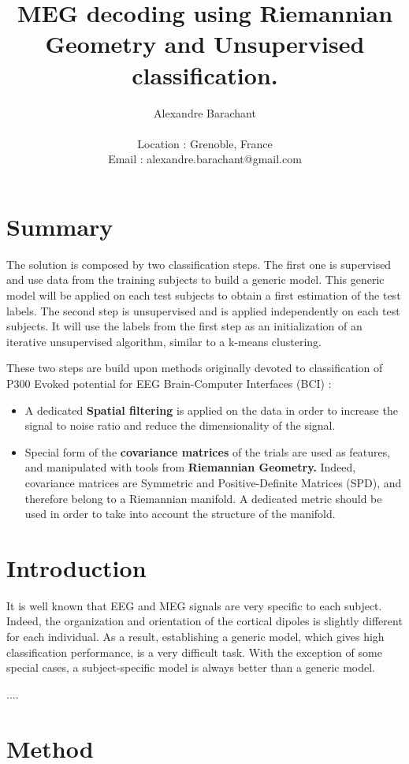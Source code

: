 \documentclass[11pt,a4paper]{article}
\title{\textbf{MEG decoding using Riemannian Geometry and Unsupervised classification.}}
\author{Alexandre Barachant \\ \\ Location : Grenoble, France \\ Email : alexandre.barachant@gmail.com }
\date{}
\begin{document}
\maketitle

\section{Summary}
The solution is composed by two classification steps. The first one is supervised and use data from the training subjects to build a generic model. This generic model will be applied on each test subjects to obtain a first estimation of the test labels. The second step is unsupervised and is applied independently on each test subjects. It will use the labels from the first step as an initialization of an iterative unsupervised algorithm, similar to a k-means clustering. 

These two steps are build upon methods originally devoted to classification of P300 Evoked potential for EEG Brain-Computer Interfaces (BCI) :
\begin{itemize}
\item A dedicated \textbf{Spatial filtering} is applied on the data in order to increase the signal to noise ratio and reduce the dimensionality of the signal.
\item Special form of the \textbf{covariance matrices} of the trials are used as features, and manipulated with tools from \textbf{Riemannian Geometry.} Indeed, covariance matrices are Symmetric and Positive-Definite Matrices (SPD), and therefore belong to a Riemannian manifold. A dedicated metric should be used in order to take into account the structure of the manifold.
\end{itemize}

\section{Introduction}
It is well known that EEG and MEG signals are very specific to each subject. Indeed, the organization and orientation of the cortical dipoles is slightly different for each individual. As a result, establishing a generic model, which gives high classification performance, is a very difficult task. With the exception of some special cases, a subject-specific model is always better than a generic model.

....

\section{Method}
\end{document}
